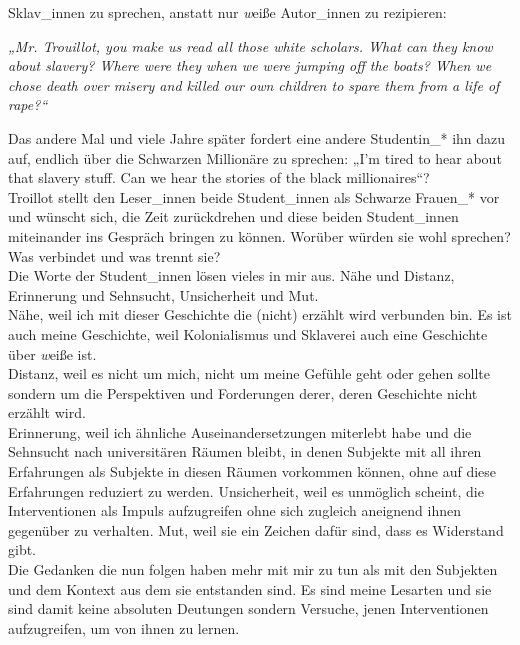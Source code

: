 Sklav\_innen zu sprechen, anstatt nur \textit{w}eiße Autor\_innen zu
rezipieren:
\begin{myenv}
  \textit{„Mr. Trouillot, you make us read all those white scholars. What can
they know about slavery? Where were they when we were jumping off the boats?
When we chose death over misery and killed our own children to spare them from
a life of rape?“\footnotemark{}}
\end{myenv}
Das andere Mal und viele Jahre später fordert eine andere
Studentin\_* ihn dazu auf, endlich über die Schwarzen Millionäre zu sprechen:
„I'm tired to hear about that slavery stuff. Can we hear the stories of the
black millionaires“?\footnotemark{}\\
Troillot stellt den Leser\_innen beide Student\_innen als Schwarze Frauen\_* vor
und wünscht sich, die Zeit zurückdrehen und diese beiden Student\_innen
miteinander ins Gespräch bringen zu können. Worüber würden sie wohl sprechen?
Was verbindet und was trennt sie?\\

Die Worte der Student\_innen lösen vieles in mir aus. Nähe und Distanz,
Erinnerung und Sehnsucht, Unsicherheit und Mut.\\
Nähe, weil ich mit dieser
Geschichte die (nicht) erzählt wird verbunden bin. Es ist auch meine
Geschichte, weil Kolonialismus und Sklaverei auch eine Geschichte über
\textit{w}eiße ist.\\
Distanz, weil es nicht um mich, nicht um meine Gefühle
geht oder gehen sollte sondern um die Perspektiven und Forderungen derer, deren
Geschichte nicht erzählt wird.\\
Erinnerung, weil ich ähnliche
Auseinandersetzungen miterlebt habe und die Sehnsucht nach universitären Räumen
bleibt, in denen Subjekte mit all ihren Erfahrungen als Subjekte in diesen
Räumen vorkommen können, ohne auf diese Erfahrungen reduziert zu werden.
Unsicherheit, weil es unmöglich scheint, die Interventionen als Impuls
aufzugreifen ohne sich zugleich aneignend ihnen gegenüber zu verhalten.  Mut,
weil sie ein Zeichen dafür sind, dass es Widerstand gibt.\\

\noindent Die Gedanken die nun
folgen haben mehr mit mir zu tun als mit den Subjekten und dem Kontext aus dem
sie entstanden sind. Es sind meine Lesarten und sie sind damit keine absoluten
Deutungen sondern Versuche, jenen Interventionen aufzugreifen, um von ihnen zu
lernen.\\

